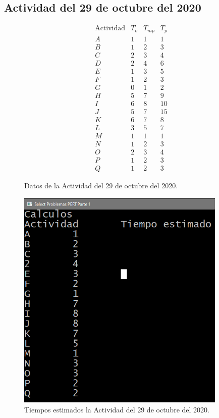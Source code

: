 \documentclass[a4paper, 12pt]{article}
\begin{document}
    \subsection{Actividad del 29 de octubre del 2020}
    \begin{figure}[H]
        \[\begin{matrix}
            \text{Actividad}&T_o&T_{mp}&T_p\\
            A&1&1&1\\
            B&1&2&3\\
            C&2&3&4\\
            D&2&4&6\\
            E&1&3&5\\
            F&1&2&3\\
            G&0&1&2\\
            H&5&7&9\\
            I&6&8&10\\
            J&5&7&15\\
            K&6&7&8\\
            L&3&5&7\\
            M&1&1&1\\
            N&1&2&3\\
            O&2&3&4\\
            P&1&2&3\\
            Q&1&2&3
        \end{matrix}\]
        \caption{Datos de la Actividad del 29 de octubre del 2020.}
    \end{figure}
    \begin{figure}[H]
        \centering
        \includegraphics[width=10cm]{act29p1.PNG}
        \caption{Tiempos estimados la Actividad del 29 de octubre del 2020.}
    \end{figure}
\end{document}
